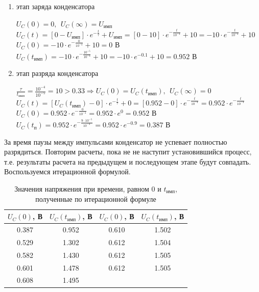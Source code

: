 \begin{enumerate}
\item этап заряда конденсатора

	$U_C(0) = 0,\ \ U_C(\infty) = U_\text{имп}$\\	
	$U_C(t) = [0 - U_\text{имп}] \cdot e^{-\frac{t}{\tau}} + U_\text{имп} = [0 - 10] \cdot e^{-\frac{t}{10^{-4}}} + 10 = -10 \cdot e^{-\frac{t}{10^{-4}}} + 10$\\
	$U_C(0) = -10 \cdot e^{-\frac{0}{10^{-4}}} + 10 = 0 \text{ В}$\\
	$U_C(t_\text{имп}) = -10 \cdot e^{-\frac{10^{-5}}{10^{-4}}} + 10 = -10 \cdot e^{-0.1} + 10 = 0.952 \text{ В}$
	
\item этап разряда конденсатора

	$\frac{\tau}{t_\text{имп}} = \frac{10^{-4}}{10^{-5}} = 10 > 0.33 \Rightarrow U_C(0) = U_C(t_\text{имп}),\ \ U_C(\infty) = 0$\\
	$U_C(t) = [U_C(t_\text{имп}) - 0] \cdot e^{-\frac{t}{\tau}} + 0 =  [0.952 - 0] \cdot e^{-\frac{t}{10^{-4}}} = 0.952 \cdot e^{-\frac{t}{10^{-4}}}$\\
	$U_C(0) = 0.952 \cdot e^{-\frac{0}{10^{-4}}} = 0.952 \cdot e^0 = 0.952 \text{ В}$\\
	$U_C(t_\text{п}) = 0.952 \cdot e^{-\frac{9 \cdot 10^{-5}}{10^{-4}}} = 0.952 \cdot e^{-0.9} = 0.387 \text{ В}$
\end{enumerate}

За время паузы между импульсами конденсатор не успевает полностью разрядиться. Повторим расчеты, пока не не наступит установившийся процесс, т.е. результаты расчета на предыдущем и последующем этапе будут совпадать. Воспользуемся итерационной формулой.

\begin{table}[H]
\begin{center}
	\caption{Значения напряжения при времени, равном $0$ и $t_\text{имп}$, полученные по итерационной формуле}
	\def\tabcolsep{25pt}
	\begin{tabular}{|c|c||c|c|}
		\hline 
		$U_C(0)$, В & $U_C(t_\text{имп})$, В & $U_C(0)$, В & $U_C(t_\text{имп})$, В \\ 
		\hline 
		0.387 & 0.952 & 0.610 & 1.502 \\
		\hline 
		0.529 & 1.302 & 0.612 & 1.504 \\
		\hline 
		0.582 & 1.430 & 0.612 & 1.505 \\ 
		\hline 
		0.601 & 1.478 & 0.612 & 1.505 \\
		\hline 
		0.608 & 1.495 & & \\
		\hline 
	\end{tabular}
\end{center}
\end{table}

